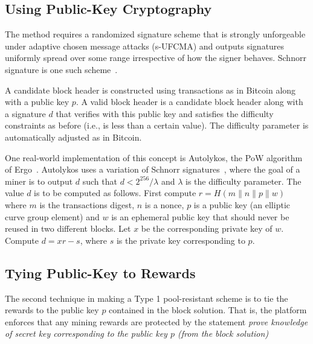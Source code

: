 \documentclass{llncs}
\newcommand{\powname}{Autolykos\xspace}
\begin{document}
\subsection{Using Public-Key Cryptography}

The method requires a randomized signature scheme that is strongly unforgeable under adaptive chosen message attacks (s-UFCMA) and outputs signatures uniformly spread over some range irrespective of how the signer behaves. Schnorr signature is one such scheme~\cite{Sch91}.

A candidate block header is constructed using transactions as in Bitcoin along with a public key $p$. A valid block header is a candidate block header along with a signature $d$ that verifies with this public key and satisfies the difficulty constraints as before (i.e., is less than a certain value). The difficulty parameter is automatically adjusted as in Bitcoin.

One real-world implementation of this concept is \powname \cite{autolykos}, the PoW algorithm of Ergo~\cite{ergo}. \powname uses a variation of Schnorr signatures~\cite{Sch91}, where the goal of a miner is to output $d$ such that $d < 2^{256}/\lambda$ and $\lambda$ is the difficulty parameter. The value $d$ is to be computed as follows. First compute $r = H(m\|n\|p\|w)$ where $m$ is the transactions digest, $n$ is a nonce, $p$ is a public key (an elliptic curve group element) and $w$ is an ephemeral public key that should never be reused in two different blocks. Let $x$ be the corresponding private key of $w$. Compute $d = xr - s$, where $s$ is the private key corresponding to $p$.


\subsection{Tying Public-Key to Rewards}

The second technique in making a Type 1 pool-resistant scheme is to tie the rewards to the public key $p$ contained in the block solution. That is, the platform enforces that any mining rewards are protected by the statement {\em prove knowledge of secret key corresponding to the public key $p$ (from the block solution)}
\end{document}

